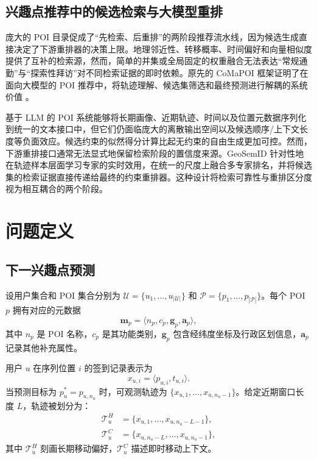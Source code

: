 \documentclass[10pt,fontset=none,twocolumn]{ctexart}
\newcommand{\POIs}{\mathcal{P}}
\newcommand{\Users}{\mathcal{U}}
\begin{document}
\subsection{兴趣点推荐中的候选检索与大模型重排}
\label{subsec:rw_retrieval_ranking}

庞大的 POI 目录促成了“先检索、后重排”的两阶段推荐流水线，因为候选生成直接决定了下游重排器的决策上限。地理邻近性、转移概率、时间偏好和向量相似度提供了互补的检索源，然而，简单的并集或全局固定的权重融合无法表达“常规通勤”与“探索性拜访”对不同检索证据的即时依赖。原先的 CoMaPOI 框架证明了在面向大模型的 POI 推荐中，将轨迹理解、候选集筛选和最终预测进行解耦的系统价值 \cite{zhong2025}。

基于 LLM 的 POI 系统能够将长期画像、近期轨迹、时间以及位置元数据序列化到统一的文本接口中，但它们仍面临庞大的离散输出空间以及候选顺序/上下文长度等负面效应。候选约束的似然得分计算比起无约束的自由生成更加可控。然而，下游重排接口通常无法显式地保留检索阶段的置信度来源。GeoSemID 针对性地在轨迹样本层面学习专家的实时效用，在统一的尺度上融合多专家排名，并将候选集的检索证据直接传递给最终的约束重排器。这种设计将检索可靠性与重排区分度视为相互耦合的两个阶段。

\section{问题定义}
\label{sec:problem}

\subsection{下一兴趣点预测}

设用户集合和 POI 集合分别为 $\Users=\{u_1,\ldots,u_{|\Users|}\}$ 和 $\POIs=\{p_1,\ldots,p_{|\POIs|}\}$。每个 POI $p$ 拥有对应的元数据
\begin{equation}
\bm{m}_{p}
=
\langle n_p,c_p,\bm{g}_p,\bm{a}_p\rangle,
\label{eq:poi_metadata}
\end{equation}
其中 $n_p$ 是 POI 名称，$c_p$ 是其功能类别，$\bm{g}_p$ 包含经纬度坐标及行政区划信息，$\bm{a}_p$ 记录其他补充属性。

用户 $u$ 在序列位置 $i$ 的签到记录表示为
\begin{equation}
x_{u,i}=\langle p_{u,i},t_{u,i}\rangle.
\label{eq:checkin}
\end{equation}
当预测目标为 $p_u^{*}=p_{u,n_u}$ 时，可观测轨迹为 $\{x_{u,1},\ldots,x_{u,n_u-1}\}$。给定近期窗口长度 $L$，轨迹被划分为：
\begin{align}
\mathcal{T}_{u}^{H}
&=
\{x_{u,1},\ldots,x_{u,n_u-L-1}\},
\label{eq:historical_trajectory}\\
\mathcal{T}_{u}^{C}
&=
\{x_{u,n_u-L},\ldots,x_{u,n_u-1}\},
\label{eq:current_trajectory}
\end{align}
其中 $\mathcal{T}_{u}^{H}$ 刻画长期移动偏好，$\mathcal{T}_{u}^{C}$ 描述即时移动上下文。
\end{document}
